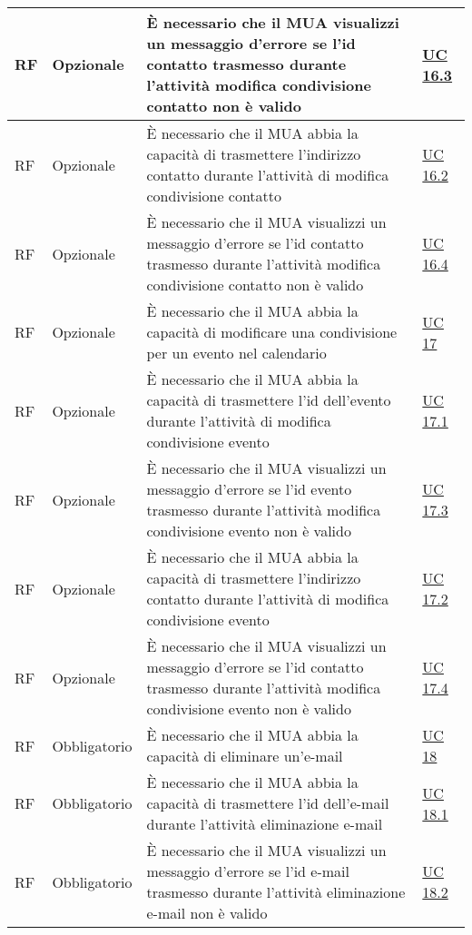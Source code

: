 \begin{longtable}{*{1}{>{\centering\arraybackslash}p{1.5cm}}*{1}{>{\centering\arraybackslash}p{2.5cm}}p{6cm}*{1}{>{\centering\arraybackslash}p{3cm}}}
    \\\hline
    RF & Opzionale & È necessario che il MUA visualizzi un messaggio d'errore se l'id contatto trasmesso durante l'attività modifica condivisione contatto non è valido & \hyperref[sec:UC16.3]{UC 16.3}
    \\\hline
    RF & Opzionale & È necessario che il MUA abbia la capacità di trasmettere l'indirizzo contatto durante l'attività di modifica condivisione contatto & \hyperref[sec:UC16.2]{UC 16.2}
    \\\hline
    RF & Opzionale & È necessario che il MUA visualizzi un messaggio d'errore se l'id contatto trasmesso durante l'attività modifica condivisione contatto non è valido & \hyperref[sec:UC16.4]{UC 16.4}
    \\\hline
    RF & Opzionale & È necessario che il MUA abbia la capacità di modificare una condivisione per un evento nel calendario & \hyperref[sec:UC17]{UC 17}
    \\\hline
    RF & Opzionale & È necessario che il MUA abbia la capacità di trasmettere l'id dell'evento durante l'attività di modifica condivisione evento & \hyperref[sec:UC17.1]{UC 17.1}
    \\\hline
    RF & Opzionale & È necessario che il MUA visualizzi un messaggio d'errore se l'id evento trasmesso durante l'attività modifica condivisione evento non è valido & \hyperref[sec:UC17.3]{UC 17.3}
    \\\hline
    RF & Opzionale & È necessario che il MUA abbia la capacità di trasmettere l'indirizzo contatto durante l'attività di modifica condivisione evento & \hyperref[sec:UC17.2]{UC 17.2}
    \\\hline
    RF & Opzionale & È necessario che il MUA visualizzi un messaggio d'errore se l'id contatto trasmesso durante l'attività modifica condivisione evento non è valido & \hyperref[sec:UC17.4]{UC 17.4}
    \\\hline
    RF & Obbligatorio & È necessario che il MUA abbia la capacità di eliminare un'e-mail & \hyperref[sec:UC18]{UC 18}
    \\\hline
    RF & Obbligatorio & È necessario che il MUA abbia la capacità di trasmettere l'id dell'e-mail durante l'attività eliminazione e-mail & \hyperref[sec:UC18.1]{UC 18.1}
    \\\hline
    RF & Obbligatorio & È necessario che il MUA visualizzi un messaggio d'errore se l'id e-mail trasmesso durante l'attività eliminazione e-mail non è valido & \hyperref[sec:UC18.2]{UC 18.2}
    \end{longtable}


